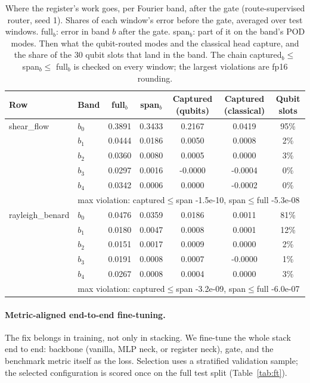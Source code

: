 \documentclass{article}
\begin{document}
\begin{table}[h]
\centering
\caption{Where the register's work goes, per Fourier band, after the gate (route-supervised router, seed 1). Shares of
each window's error before the gate, averaged over test windows. full$_b$: error in band $b$ after the gate.
span$_b$: part of it on the band's POD modes. Then what the qubit-routed modes and the classical head capture, and
the share of the 30 qubit slots that land in the band. The chain captured$_b\le$ span$_b\le$ full$_b$ is checked on
every window; the largest violations are fp16 rounding.}
\label{tab:gatebands}
\scriptsize
\setlength{\tabcolsep}{4pt}
\begin{tabular}{llccccc}
\toprule
Row & Band & full$_b$ & span$_b$ & Captured (qubits) & Captured (classical) & Qubit slots \\
\midrule
shear\_flow & $b_0$ & 0.3891 & 0.3433 & 0.2167 & 0.0419 & 95\% \\
 & $b_1$ & 0.0444 & 0.0186 & 0.0050 & 0.0008 & 2\% \\
 & $b_2$ & 0.0360 & 0.0080 & 0.0005 & 0.0000 & 3\% \\
 & $b_3$ & 0.0297 & 0.0016 & -0.0000 & -0.0004 & 0\% \\
 & $b_4$ & 0.0342 & 0.0006 & 0.0000 & -0.0002 & 0\% \\
& \multicolumn{6}{l}{max violation: captured$\le$span -1.5e-10, span$\le$full -5.3e-08} \\
rayleigh\_benard & $b_0$ & 0.0476 & 0.0359 & 0.0186 & 0.0011 & 81\% \\
 & $b_1$ & 0.0180 & 0.0047 & 0.0008 & 0.0001 & 12\% \\
 & $b_2$ & 0.0151 & 0.0017 & 0.0009 & 0.0000 & 2\% \\
 & $b_3$ & 0.0191 & 0.0008 & 0.0007 & -0.0000 & 1\% \\
 & $b_4$ & 0.0267 & 0.0008 & 0.0004 & 0.0000 & 3\% \\
& \multicolumn{6}{l}{max violation: captured$\le$span -3.2e-09, span$\le$full -6.0e-07} \\
\bottomrule
\end{tabular}
\end{table}

\paragraph{Metric-aligned end-to-end fine-tuning.} The fix belongs in training, not only in stacking. We fine-tune the
whole stack end to end: backbone (vanilla, MLP neck, or register neck), gate, and the benchmark metric itself as the loss.
Selection uses a stratified validation sample; the selected configuration is scored once on the full test split
(Table~\ref{tab:ft}).
\end{document}

